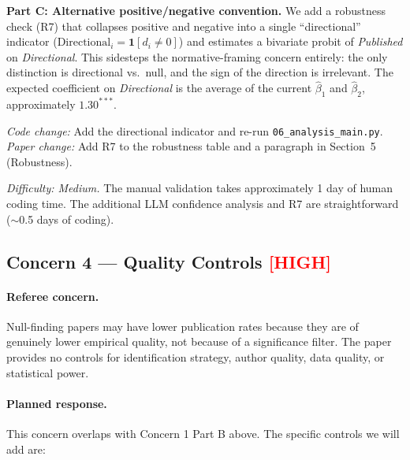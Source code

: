 \documentclass[12pt]{article}
\newcommand{\HIGH}{\textcolor{red}{\textbf{[HIGH]}}}
\begin{document}
\textbf{Part C: Alternative positive/negative convention.}
We add a robustness check (R7) that collapses positive and negative into a
single ``directional'' indicator ($\text{Directional}_i = \mathbf{1}[d_i
\neq 0]$) and estimates a bivariate probit of \textit{Published} on
\textit{Directional}.  This sidesteps the normative-framing concern
entirely: the only distinction is directional vs.\ null, and the sign of
the direction is irrelevant.  The expected coefficient on \textit{Directional}
is the average of the current $\hat\beta_1$ and $\hat\beta_2$, approximately
$1.30^{***}$.

\textit{Code change:} Add the directional indicator and re-run
\texttt{06\_analysis\_main.py}.  \textit{Paper change:} Add R7 to the
robustness table and a paragraph in Section~5 (Robustness).

\textit{Difficulty: Medium.}  The manual validation takes approximately 1
day of human coding time.  The additional LLM confidence analysis and R7 are
straightforward ($\sim$0.5 days of coding).

\subsection{Concern 4 --- Quality Controls \HIGH}

\paragraph{Referee concern.}
Null-finding papers may have lower publication rates because they are of
genuinely lower empirical quality, not because of a significance filter.  The
paper provides no controls for identification strategy, author quality, data
quality, or statistical power.

\paragraph{Planned response.}

This concern overlaps with Concern 1 Part B above.  The specific controls we
will add are:
\end{document}
